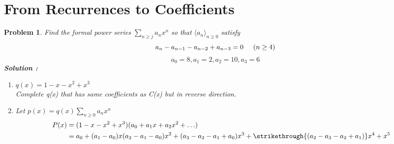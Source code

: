 \documentclass{article}
\newtheorem{expx}[theorem]{Problem}
\begin{document}
\section{From Recurrences to Coefficients}
\begin{expx}
Find the formal power series \(\sum_{n\geq j} a_nx^n\)  so that \(\langle a_n \rangle_{n \geq 0}\) satisfy
$$ a_n - a_{n-1} - a_{n-2} + a_{n-3} = 0 \hspace{0.5cm} (n \geq 4)$$
$$ a_0 = 8, a_1 = 2, a_2 = 10, a_3 = 6 $$
\textbf{ Solution : }
\begin{enumerate}
\item \(q(x) = 1 - x - x^2 + x^3\) \\
Complete q(x) that has same coefficients as C(x) but in reverse direction. 
\item Let \(p(x) = q(x) \sum_{n \geq 0} a_n x^n\)
\[\begin{aligned}
P(x) & = (1 - x - x^2 + x^3) (a_0 + a_1x + a_2x^2 + \ldots) \\
& = a_0 + (a_1 - a_0)x (a_2 - a_1 - a_0) x^2 + (a_3 - a_2 - a_1 + a_0)x^3  + \strikethrough{(a_2 - a_3 - a_2 + a_1)} x^4 + x^5 \\
\end{aligned}\]
\end{enumerate}
\end{expx}
\end{document}
